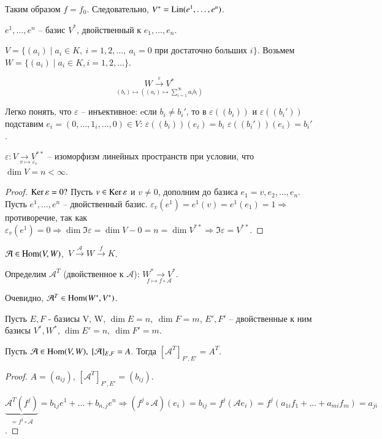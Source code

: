 \documentclass[main]{subfiles}
\begin{document}
Таким образом $f = f_0$. Следовательно, $V^* = \operatorname{Lin}(e^1,\dots,e^n)$.

$e^1, \ldots,e^n$ -- базис $V^*$, двойственный к $e_1,\dots, e_n$.
\begin{example}
    $V = \{(a_i) \mid a_i \in K, \ i = 1,2,\dots, \ a_i = 0 \text{ при достаточно больших } i \}$.
    Возьмем $W=\{(a_i) \mid a_i \in K, i = 1,2,\dots \}$.

    \[\underset{(b_i)\mapsto((a_i)\mapsto \sum_{i = 1}^{\infty}a_ib_i)}{W \overset{\varepsilon}{\longrightarrow} V^*}\]

    Легко понять, что $\varepsilon$ -- инъективное: eсли $b_i \neq b_i'$, то в $\varepsilon((b_i))$ и $\varepsilon((b_i'))$ подставим $e_i = (0, \ldots, 1_i, \ldots, 0) \in V$: $\varepsilon((b_i))(e_i) = b_i$ \neq $\varepsilon((b_i'))(e_i) = b_i'$.
\end{example}

\begin{proposition}
    $\varepsilon: \underset{v \mapsto \varepsilon_v}{V \to V^{**}}$ -- изоморфизм линейных пространств при условии,  что $\dim V=n < \infty$.
\end{proposition}

\begin{proof}
    $\operatorname{Ker}\varepsilon = 0 ?$
    Пусть $v \in \operatorname{Ker}\varepsilon$ и $v \neq 0$, дополним до базиса $e_1=v, e_2,\dots,e_n$.
    Пусть $e^1,\dots, e^n$ -- двойственный базис.
    $\varepsilon_v(e^1)=e^1(v) = e^1(e_1) = 1 \Rightarrow$ противоречие, так как $\varepsilon_v(e^1) = 0
        \Rightarrow \dim \Im \varepsilon = \dim V - 0 = n = \dim V^{**} \Rightarrow \Im \varepsilon = V^{**}$.
\end{proof}

$\mathcal{A} \in \operatorname{Hom}(V,W)$,\ $V \overset{\mathcal{A}}{\to} W \overset{f}{\to} K$.

Определим $\mathcal{A}^T$ (двойственное к $\mathcal{A}$): $\underset{f \mapsto f \circ \mathcal{A}}{W^* \to V^*}$.

Очевидно, $\mathcal{A}^T \in \operatorname{Hom}(W^*,V^*)$.

\begin{proposition}
    Пусть $E,F$ - базисы V, W, $\dim E = n, \ \dim F = m$, $E', F'$ -- двойственные к ним базисы $V^*, W^*$, $\dim E' = n, \ \dim F' = m$.

    Пусть $\mca \in \Hom(V,W), \ [\mathcal{A}]_{E,F} = A$. Тогда $[\mathcal{A}^T]_{F',E'} = A^T$.
\end{proposition}

\begin{proof}
    $A = (a_{ij})$, $[\mathcal{A}^T]_{F',E'} = (b_{ij})$.

    $\underbrace{\mathcal{A}^T(f^j)}_{=f^j\circ \mathcal{A}} = b_{1j}e^1+\dots+b_{n,j}e^n \Rightarrow  (f^j \circ \mathcal{A})(e_i) = b_{ij} = f^j(\mathcal{A}e_i)=f^j(a_{1i}f_1+\dots+a_{mi}f_m)=a_{ji}$.
\end{proof}
\end{document}
